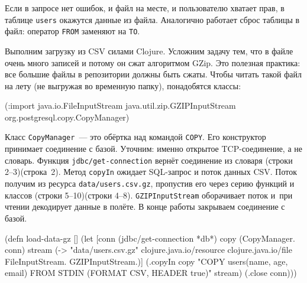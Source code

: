 Если в запросе нет ошибок, и файл на месте, и пользователю хватает прав, в
таблице \verb|users| окажутся данные из файла. Аналогично работает сброс
таблицы в файл: оператор \verb|FROM| заменяют на \verb|TO|.


Выполним загрузку из CSV силами Clojure. Усложним задачу тем, что в файле очень
много записей и потому он сжат алгоритмом GZip. Это полезная практика: все
большие файлы в репозитории должны быть сжаты. Чтобы читать такой файл на лету
(не выгружая во временную папку), понадобятся классы:

\begin{english}
  \begin{clojure}
(:import java.io.FileInputStream
         java.util.zip.GZIPInputStream
         org.postgresql.copy.CopyManager)
  \end{clojure}
\end{english}

Класс \verb|CopyManager|~--- это обёртка над командой \verb|COPY|. Его конструктор
принимает соединение с базой. Уточним: именно открытое TCP-соединение, а не
словарь. Функция \verb|jdbc/get-connection| вернёт соединение из словаря
\ifx\DEVICETYPE\MOBILE(строки 2--3)\else(строка~2)\fi. Метод \verb|copyIn| ожидает
SQL-запрос и поток данных CSV. Поток получим из ресурса \verb|data/users.csv.gz|,
пропустив его через серию функций и классов
\ifx\DEVICETYPE\MOBILE(строки 5--10)\else(строки 4--8).\fi
\verb|GZIPInputStream| оборачивает поток и~при чтении декодирует данные в полёте.
В конце работы закрываем соединение с базой.


\ifx\DEVICETYPE\MOBILE

\begin{english}
  \begin{clojure/lines}
(defn load-data-gz []
  (let [conn
        (jdbc/get-connection *db*)
        copy (CopyManager. conn)
        stream
        (-> "data/users.csv.gz"
            clojure.java.io/resource
            clojure.java.io/file
            FileInputStream.
            GZIPInputStream.)]
   (.copyIn copy
     "COPY users(name, age, email)
      FROM STDIN
      (FORMAT CSV, HEADER true)"
     stream)
   (.close conn)))
  \end{clojure/lines}
\end{english}

\else

